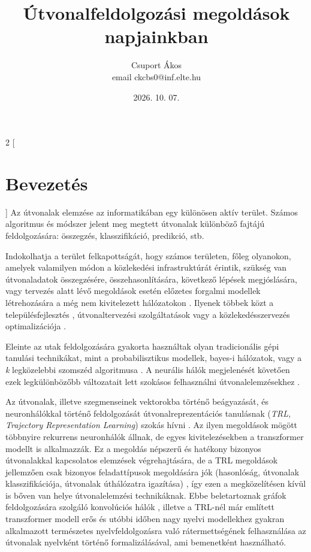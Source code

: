 \documentclass{article}
\title{Útvonalfeldolgozási megoldások napjainkban}
\author{Csuport Ákos \\ email {ckcbs0@inf.elte.hu}}
\affil[1]{Eötvös Loránd Tudományegyetem Informatikai Kar}
\date{2026. 10. 07.}
\begin{document}
\maketitle

\begin{multicols}{2}
[
\section{Bevezetés}
]
Az útvonalak elemzése az informatikában egy különösen aktív terület. Számos algoritmus és módszer jelent meg megtett útvonalak
különböző fajtájú feldolgozására: összegzés, klasszifikáció, predikció, stb. \cite{hussein2026kafy}

Indokolhatja a terület felkapottságát, hogy számos területen, főleg olyanokon, amelyek valamilyen módon a közlekedési infrastruktúrát érintik,
szükség van útvonaladatok összegzésére, összehasonlítására, következő lépések megjóslására, \cite{fang2021mdtp} vagy tervezés alatt lévő megoldások esetén előzetes forgalmi modellek 
létrehozására a még nem kivitelezett hálózatokon \cite{hussein2026kafy}. Ilyenek többek közt a településfejlesztés \cite{zhou2024red} \cite{hussein2026kafy}, útvonaltervezési szolgáltatások \cite{hussein2026kafy} vagy a közlekedésszervezés 
optimalizációja \cite{zhou2024red}.

Eleinte az utak feldolgozására gyakorta használtak olyan tradicionális gépi tanulási technikákat, mint a probabilisztikus modellek, 
bayes-i hálózatok, vagy a \textit{k} legközelebbi szomszéd algoritmusa \cite{fang2021mdtp}. A neurális hálók megjelenését követően ezek legkülönbözőbb változatait
lett szokásos felhasználni útvonalelemzésekhez \cite{hussein2026kafy} \cite{zhou2024red} \cite{fang2021mdtp}.

Az útvonalak, illetve szegmenseinek vektorokba történő beágyazását, és neuronhálókkal történő feldolgozását útvonalreprezentációs
tanulásnak (\textit{TRL, Trajectory Representation Learning}) szokás hívni \cite{zhou2024red}. Az ilyen megoldások mögött többnyire rekurrens neuronhálók
állnak, de egyes kivitelezésekben a transzformer modellt is alkalmazzák. \cite{zhou2024red} Ez a megoldás népszerű és hatékony bizonyos útvonalakkal kapcsolatos
elemzések végrehajtására, de a TRL megoldások jellemzően csak bizonyos feladattípusok megoldására jók (hasonlóság, útvonalak klasszifikációja,
útvonalak úthálózatra igazítása) \cite{hussein2026kafy} \cite{zhou2024red}, így ezen a megközelítésen kívül is bőven van helye útvonalelemzési technikáknak. Ebbe beletartoznak
gráfok feldolgozására szolgáló konvolúciós hálók \cite{fang2021mdtp}, illetve a TRL-nél már említett transzformer modell \cite{vaswani2017attention} erős és utóbbi időben nagy nyelvi
modellekhez gyakran alkalmazott természetes nyelvfeldolgozásra való rátermettségének felhasználása az útvonalak nyelvként történő formalizálásával,
ami bemenetként használható.


\end{multicols}
\end{document}
